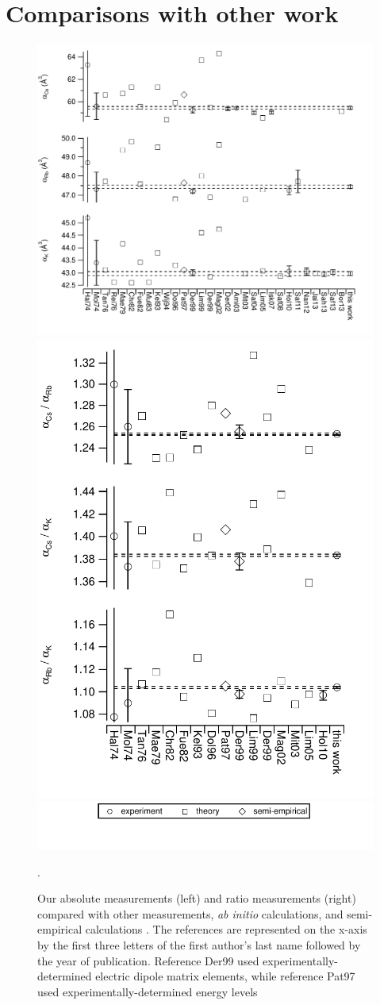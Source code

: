 \documentclass[twocolumn,prl,showpacs,superscriptaddress]{revtex4-1}   %
\begin{document}
\section{Comparisons with other work}

\begin{figure}
\includegraphics[width=0.60\linewidth,keepaspectratio]{displayAbsComps.pdf}
\includegraphics[width=0.38\linewidth,keepaspectratio]{displayRatComps.pdf}
\includegraphics[width=0.55\linewidth,keepaspectratio]{displayCompsLegend.pdf}
\caption{\label{comparisons}Our absolute measurements (left) and ratio measurements (right) compared with other measurements, \textit{ab initio} calculations, and semi-empirical calculations 
\cite{Molof1974,Hall1974,Tang1976,Reinsch1976,Kutzelnigg1978,
Christiansen1982,Fuentealba1999,Muller1984,Kello1993,VanWijngaarden1994,
Dolg1996,Patil1997,Derevianko1998,Magnier2002,Derevianko2001,
Amini2003,Mitroy2003,Safronova2004,Lim2005,Safronova2008,
Holmgren2010,Safronova2011,Nandy2012,Jiang2013,Sahoo2013,
Safronova2013,Borschevsky2013}.
The references are represented on the x-axis by the first three letters of the first author's last name followed by the year of publication. Reference Der99 used experimentally-determined electric dipole matrix elements, while reference Pat97 used experimentally-determined energy levels \cite{Derevianko1998,Patil1997}}.
\end{figure}
\end{document}
